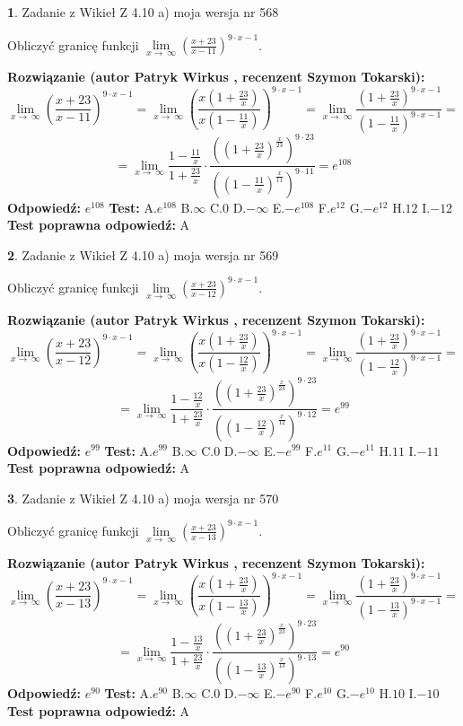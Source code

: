 \documentclass[12pt, a4paper]{article}
\theoremstyle{definition} %
\newtheorem{zad}{}
\newcommand{\zadStart}[1]{\begin{zad}#1\newline}
\newcommand{\zadStop}{\end{zad}}
\newcommand{\rozwStart}[2]{\noindent \textbf{Rozwiązanie (autor #1 , recenzent #2): }\newline}
\newcommand{\rozwStop}{\newline}
\newcommand{\odpStart}{\noindent \textbf{Odpowiedź:}\newline}
\newcommand{\odpStop}{\newline}
\newcommand{\testStart}{\noindent \textbf{Test:}\newline}
\newcommand{\testStop}{\newline}
\newcommand{\kluczStart}{\noindent \textbf{Test poprawna odpowiedź:}\newline}
\newcommand{\kluczStop}{\newline}
\begin{document}
\zadStart{Zadanie z Wikieł Z 4.10 a) moja wersja nr 568}

Obliczyć granicę funkcji  $\lim\limits_{x\to\ \infty}(\frac{x+23}{x-11})^{9\cdot x-1}$.
\zadStop
\rozwStart{Patryk Wirkus}{Szymon Tokarski}
$$\lim\limits_{x\to\ \infty}(\frac{x+23}{x-11})^{9\cdot x-1} = \lim\limits_{x\to\ \infty}(\frac{x(1+\frac{23}{x})}{x(1-\frac{11}{x})})^{9\cdot x-1}=\lim\limits_{x\to\ \infty}\frac{(1+\frac{23}{x})^{9\cdot x-1}}{(1-\frac{11}{x})^{9\cdot x-1}}=$$
$$=\lim\limits_{x\to\ \infty}\frac{1-\frac{11}{x}}{1+\frac{23}{x}}\cdot\frac{((1+\frac{23}{x})^{\frac{x}{23}})^{9\cdot23}}{((1-\frac{11}{x})^{\frac{x}{11}})^{9\cdot11}}=e^{108}$$
\rozwStop
\odpStart
$e^{108}$
\odpStop
\testStart
A.$e^{108}$ B.$\infty$ C.$0$ D.$-\infty$ E.$-e^{108}$
F.$e^{12}$ G.$-e^{12}$
H.$12$
I.$-12$
\testStop
\kluczStart
A
\kluczStop



\zadStart{Zadanie z Wikieł Z 4.10 a) moja wersja nr 569}

Obliczyć granicę funkcji  $\lim\limits_{x\to\ \infty}(\frac{x+23}{x-12})^{9\cdot x-1}$.
\zadStop
\rozwStart{Patryk Wirkus}{Szymon Tokarski}
$$\lim\limits_{x\to\ \infty}(\frac{x+23}{x-12})^{9\cdot x-1} = \lim\limits_{x\to\ \infty}(\frac{x(1+\frac{23}{x})}{x(1-\frac{12}{x})})^{9\cdot x-1}=\lim\limits_{x\to\ \infty}\frac{(1+\frac{23}{x})^{9\cdot x-1}}{(1-\frac{12}{x})^{9\cdot x-1}}=$$
$$=\lim\limits_{x\to\ \infty}\frac{1-\frac{12}{x}}{1+\frac{23}{x}}\cdot\frac{((1+\frac{23}{x})^{\frac{x}{23}})^{9\cdot23}}{((1-\frac{12}{x})^{\frac{x}{12}})^{9\cdot12}}=e^{99}$$
\rozwStop
\odpStart
$e^{99}$
\odpStop
\testStart
A.$e^{99}$ B.$\infty$ C.$0$ D.$-\infty$ E.$-e^{99}$
F.$e^{11}$ G.$-e^{11}$
H.$11$
I.$-11$
\testStop
\kluczStart
A
\kluczStop



\zadStart{Zadanie z Wikieł Z 4.10 a) moja wersja nr 570}

Obliczyć granicę funkcji  $\lim\limits_{x\to\ \infty}(\frac{x+23}{x-13})^{9\cdot x-1}$.
\zadStop
\rozwStart{Patryk Wirkus}{Szymon Tokarski}
$$\lim\limits_{x\to\ \infty}(\frac{x+23}{x-13})^{9\cdot x-1} = \lim\limits_{x\to\ \infty}(\frac{x(1+\frac{23}{x})}{x(1-\frac{13}{x})})^{9\cdot x-1}=\lim\limits_{x\to\ \infty}\frac{(1+\frac{23}{x})^{9\cdot x-1}}{(1-\frac{13}{x})^{9\cdot x-1}}=$$
$$=\lim\limits_{x\to\ \infty}\frac{1-\frac{13}{x}}{1+\frac{23}{x}}\cdot\frac{((1+\frac{23}{x})^{\frac{x}{23}})^{9\cdot23}}{((1-\frac{13}{x})^{\frac{x}{13}})^{9\cdot13}}=e^{90}$$
\rozwStop
\odpStart
$e^{90}$
\odpStop
\testStart
A.$e^{90}$ B.$\infty$ C.$0$ D.$-\infty$ E.$-e^{90}$
F.$e^{10}$ G.$-e^{10}$
H.$10$
I.$-10$
\testStop
\kluczStart
A
\kluczStop
\end{document}
